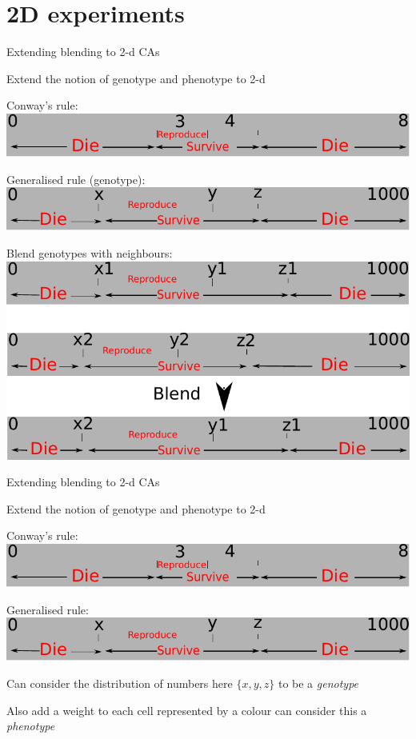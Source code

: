\part{2D experiments}
\frame{\partpage}


\begin{frame}{Extending blending to 2-d CAs}{}
\begin{center}
\item{Extend the notion of genotype and phenotype to 2-d}
\item{Conway's rule:}
\includegraphics[width=.9\textwidth]{conway.pdf}
\item{Generalised rule (genotype):}
  \includegraphics[width=.9\textwidth]{2dgenotype.pdf}
\item{Blend genotypes with neighbours:}
\includegraphics[width=.9\textwidth]{2dgenotypeblend.pdf}
\end{center}
\end{frame}

\begin{frame}{Extending blending to 2-d CAs}{}
\begin{center}
\item{Extend the notion of genotype and phenotype to 2-d}
\item{Conway's rule:}
\includegraphics[width=.9\textwidth]{conway.pdf}
\item{Generalised rule:}
  \includegraphics[width=.9\textwidth]{2dgenotype.pdf}
\item{Can consider the distribution of numbers here $\{x,y,z\}$ to be a {\em genotype}}
\item{Also add a weight to each cell represented by a colour can consider this a {\em phenotype}}
\end{center}
\end{frame}



